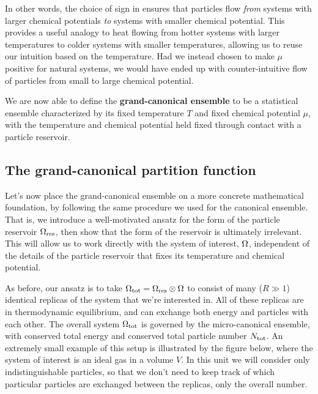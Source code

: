 In other words, the choice of sign in  ensures that particles flow \textit{from} systems with larger chemical potentials \textit{to} systems with smaller chemical potential.
This provides a useful analogy to heat flowing from hotter systems with larger temperatures to colder systems with smaller temperatures, allowing us to reuse our intuition based on the temperature.
Had we instead chosen to make $\mu$ positive for natural systems, we would have ended up with counter-intuitive flow of particles from small to large chemical potential.

\begin{shaded}
  We are now able to define the \textbf{grand-canonical ensemble} to be a statistical ensemble characterized by its fixed temperature $T$ and fixed chemical potential $\mu$, with the temperature and chemical potential held fixed through contact with a particle reservoir.
\end{shaded}



\subsection{\label{sec:Zg}The grand-canonical partition function}
Let's now place the grand-canonical ensemble on a more concrete mathematical foundation, by following the same procedure we used for the canonical ensemble.
That is, we introduce a well-motivated ansatz for the form of the particle reservoir $\Omega_{\text{res}}$, then show that the form of the reservoir is ultimately irrelevant.
This will allow us to work directly with the system of interest, $\Omega$, independent of the details of the particle reservoir that fixes its temperature and chemical potential.

As before, our ansatz is to take $\Omega_{\text{tot}} = \Omega_{\text{res}} \otimes \Omega$ to consist of many ($R \gg 1$) identical replicas of the system \Om that we're interested in.
All of these replicas are in thermodynamic equilibrium, and can exchange both energy and particles with each other.
The overall system $\Omega_{\text{tot}}$ is governed by the micro-canonical ensemble, with conserved total energy \Etot and conserved total particle number $N_{\text{tot}}$.
An extremely small example of this setup is illustrated by the figure below, where the system of interest is an ideal gas in a volume $V$.
In this unit we will consider only indistinguishable particles, so that we don't need to keep track of which particular particles are exchanged between the replicas, only the overall number.

